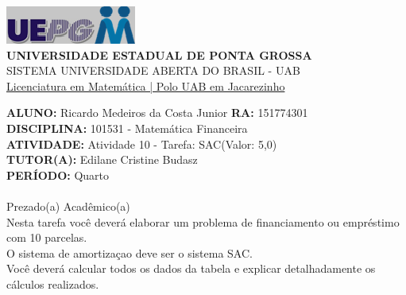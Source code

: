 \documentclass[a4paper, 12pt]{article}
\begin{document}
\begin{flushleft}\includegraphics{logo}\\
\textbf{UNIVERSIDADE ESTADUAL DE PONTA GROSSA} \\
SISTEMA UNIVERSIDADE ABERTA DO BRASIL - UAB \\
\underline{Licenciatura em Matemática | Polo UAB em Jacarezinho}\end{flushleft} 
\textbf{ALUNO:} Ricardo Medeiros da Costa Junior   \textbf{RA:} 151774301 \\
\textbf{DISCIPLINA:} 101531 - Matemática Financeira \\
\textbf{ATIVIDADE:} Atividade 10 - Tarefa: SAC(Valor: 5,0) \\ 
\textbf{TUTOR(A):} Edilane Cristine Budasz \\
\textbf{PERÍODO:} Quarto \\\\
Prezado(a) Acadêmico(a)\\

Nesta tarefa você deverá elaborar um problema de financiamento ou empréstimo com 10 parcelas.\\

O sistema de amortizaçao deve ser o sistema SAC.\\

Você deverá calcular todos os dados da tabela e explicar detalhadamente os cálculos realizados.\\\\\\
\end{document}
